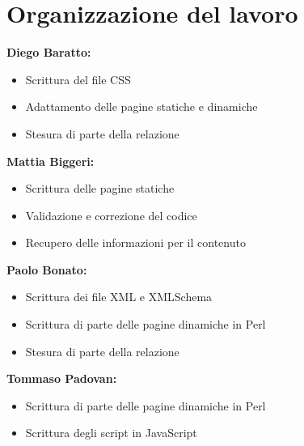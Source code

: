 \documentclass{article}
\begin{document}
\appendix
	\section{Organizzazione del lavoro}
	
	\textbf{Diego Baratto:}\\
	\begin{itemize}
	\item Scrittura del file CSS
	\item Adattamento delle pagine statiche e dinamiche
	\item Stesura di parte della relazione
	\end{itemize}
\textbf{Mattia Biggeri:}\\
	\begin{itemize}
	\item Scrittura delle pagine statiche
	\item Validazione e correzione del codice
	\item Recupero delle informazioni per il contenuto
	\end{itemize}
\textbf{Paolo Bonato:}\\
	\begin{itemize}
	\item Scrittura dei file XML e XMLSchema
	\item Scrittura di parte delle pagine dinamiche in Perl
	\item Stesura di parte della relazione
	\end{itemize}
\textbf{Tommaso Padovan:}\\
	\begin{itemize}
	\item Scrittura di parte delle pagine dinamiche in Perl
	\item Scrittura degli script in JavaScript
	\end{itemize}
\end{document}
